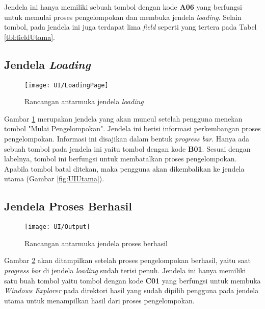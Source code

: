 Jendela ini hanya memiliki sebuah tombol dengan kode \textbf{A06} yang berfungsi untuk memulai proses pengelompokan dan membuka jendela \textit{loading}. Selain tombol, pada jendela ini juga terdapat lima \textit{field} seperti yang tertera pada Tabel \ref{tbl:fieldUtama}.

\subsection{Jendela \textit{Loading}}

\begin{figure}[h]
	\begin{center}
		\texttt{[image: UI/LoadingPage]}
		\caption{Rancangan antarmuka jendela \textit{loading}}
		\label{fig:UILoading}
	\end{center}
\end{figure}

Gambar \ref{fig:UILoading} merupakan jendela yang akan muncul setelah pengguna menekan tombol "Mulai Pengelompokan". Jendela ini berisi informasi perkembangan proses pengelompokan. Informasi ini disajikan dalam bentuk \textit{progress bar}. Hanya ada sebuah tombol pada jendela ini yaitu tombol dengan kode \textbf{B01}. Sesuai dengan labelnya, tombol ini berfungsi untuk membatalkan proses pengelompokan. Apabila tombol batal ditekan, maka pengguna akan dikembalikan ke jendela utama (Gambar \ref{fig:UIUtama}).

\subsection{Jendela Proses Berhasil}
\begin{figure}[h]
	\begin{center}
		\texttt{[image: UI/Output]}
		\caption{Rancangan antarmuka jendela proses berhasil}
		\label{fig:UISuccess}
	\end{center}
\end{figure}

Gambar \ref{fig:UISuccess} akan ditampilkan setelah proses pengelompokan berhasil, yaitu saat \textit{progress bar} di jendela \textit{loading} sudah terisi penuh. Jendela ini hanya memiliki satu buah tombol yaitu tombol dengan kode \textbf{C01} yang berfungsi untuk membuka \textit{Windows Explorer} pada direktori hasil yang sudah dipilih pengguna pada jendela utama untuk menampilkan hasil dari proses pengelompokan.